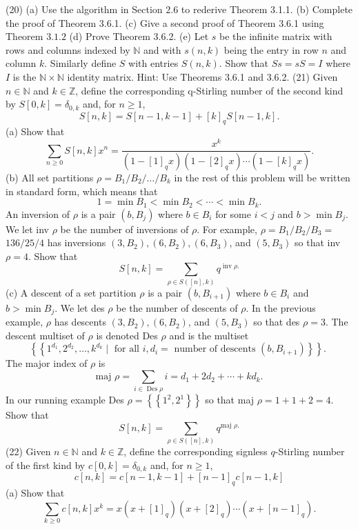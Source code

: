 \documentclass[a4paper,12pt]{ctexbook}
\begin{document}
(20) (a) Use the algorithm in Section $2.6$ to rederive Theorem 3.1.1.
(b) Complete the proof of Theorem 3.6.1.
(c) Give a second proof of Theorem 3.6.1 using Theorem $3.1 .2$
(d) Prove Theorem 3.6.2.
(e) Let $s$ be the infinite matrix with rows and columns indexed by $\mathbb{N}$ and with $s(n, k)$ being the entry in row $n$ and column $k$. Similarly define $S$ with entries $S(n, k)$. Show that $S s=s S=I$ where $I$ is the $\mathbb{N} \times \mathbb{N}$ identity matrix. Hint: Use Theorems 3.6.1 and 3.6.2.
(21) Given $n \in \mathbb{N}$ and $k \in \mathbb{Z}$, define the corresponding q-Stirling number of the second kind by $S[0, k]=\delta_{0, k}$ and, for $n \geq 1$,
$$
S[n, k]=S[n-1, k-1]+[k]_{q} S[n-1, k] .
$$
(a) Show that
$$
\sum_{n \geq 0} S[n, k] x^{n}=\frac{x^{k}}{\left(1-[1]_{q} x\right)\left(1-[2]_{q} x\right) \cdots\left(1-[k]_{q} x\right)} .
$$
(b) All set partitions $\rho=B_{1} / B_{2} / \ldots / B_{k}$ in the rest of this problem will be written in standard form, which means that
$$
1=\min B_{1}<\min B_{2}<\cdots<\min B_{k} .
$$
An inversion of $\rho$ is a pair $\left(b, B_{j}\right)$ where $b \in B_{i}$ for some $i<j$ and $b>\min B_{j}$. We let inv $\rho$ be the number of inversions of $\rho$. For example, $\rho=B_{1} / B_{2} / B_{3}=$ $136 / 25 / 4$ has inversions $\left(3, B_{2}\right),\left(6, B_{2}\right),\left(6, B_{3}\right)$, and $\left(5, B_{3}\right)$ so that inv $\rho=4$. Show that
$$
S[n, k]=\sum_{\rho \in S([n], k)} q^{\operatorname{inv} \rho .}
$$
(c) A descent of a set partition $\rho$ is a pair $\left(b, B_{i+1}\right)$ where $b \in B_{i}$ and $b>\min B_{j}$. We let des $\rho$ be the number of descents of $\rho$. In the previous example, $\rho$ has descents $\left(3, B_{2}\right),\left(6, B_{2}\right)$, and $\left(5, B_{3}\right)$ so that des $\rho=3$. The descent multiset of $\rho$ is denoted Des $\rho$ and is the multiset
$$
\left\{\left\{1^{d_{1}}, 2^{d_{2}}, \ldots, k^{d_{k}} \mid \text { for all } i, d_{i}=\text { number of descents }\left(b, B_{i+1}\right)\right\}\right\} \text {. }
$$
The major index of $\rho$ is
$$
\text { maj } \rho=\sum_{i \in \operatorname{Des} \rho} i=d_{1}+2 d_{2}+\cdots+k d_{k} \text {. }
$$
In our running example Des $\rho=\left\{\left\{1^{2}, 2^{1}\right\}\right\}$ so that maj $\rho=1+1+2=4$. Show that
$$
S[n, k]=\sum_{\rho \in S([n], k)} q^{\text {maj } \rho .}
$$
(22) Given $n \in \mathbb{N}$ and $k \in \mathbb{Z}$, define the corresponding signless $q$-Stirling number of the first kind by $c[0, k]=\delta_{0, k}$ and, for $n \geq 1$,
$$
c[n, k]=c[n-1, k-1]+[n-1]_{q} c[n-1, k]
$$
(a) Show that
$$
\sum_{k \geq 0} c[n, k] x^{k}=x\left(x+[1]_{q}\right)\left(x+[2]_{q}\right) \cdots\left(x+[n-1]_{q}\right) .
$$
\end{document}
